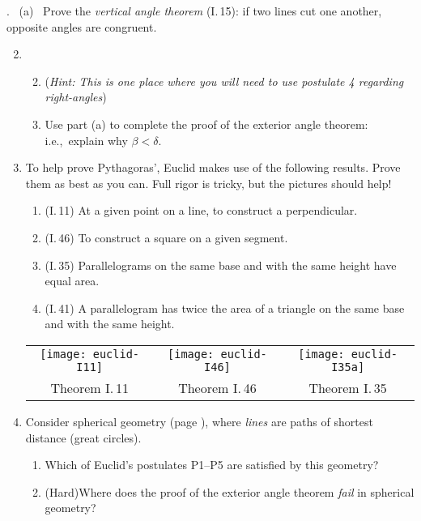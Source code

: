 \begin{exercises}
	\hangindent{}. \ (a) \ Prove the \emph{vertical angle theorem} (I.\,15): if two lines cut one another, opposite angles are congruent.\vspace{-8pt}

	\begin{enumerate}\setcounter{enumi}{1}
	  \item[]\begin{enumerate}\setcounter{enumii}{1}
	    \item[](\emph{Hint: This is one place where you will need to use postulate 4 regarding right-angles})
	    \item Use part (a) to complete the proof of the exterior angle theorem: i.e.,\ explain why $\beta<\delta$.
	  \end{enumerate}
	
		\item\label{ex:pythagexs} To help prove Pythagoras', Euclid makes use of the following results. Prove them as best as you can. Full rigor is tricky, but the pictures should help!
		\begin{enumerate}
		  \item (I.\,11) At a given point on a line, to construct a perpendicular.
		  \item (I.\,46) To construct a square on a given segment.
		  \item (I.\,35) Parallelograms on the same base and with the same height have equal area.
		  \item (I.\,41) A parallelogram has twice the area of a triangle on the same base and with the same height.
		\end{enumerate}
		
		\begin{center}
			\begin{tabular}{c@{\quad}c@{\quad}c}
				\texttt{[image: euclid-I11]}
				&
				\texttt{[image: euclid-I46]}
				&
				\texttt{[image: euclid-I35a]}
				\\[-2pt]
				Theorem I.\,11
				&
				Theorem I.\,46
				&
				Theorem I.\,35
			\end{tabular}
		\end{center}
		
	  
	  \item Consider spherical geometry (page \pageref{pg:sphere}), where \emph{lines} are paths of shortest distance (great circles).
	 	\begin{enumerate}
	 	  \item Which of Euclid's postulates P1--P5 are satisfied by this geometry?
	  	\item (Hard)\lstsp Where does the proof of the exterior angle theorem \emph{fail} in spherical geometry? 
	 	\end{enumerate}
	  

\end{enumerate}
\end{exercises}
